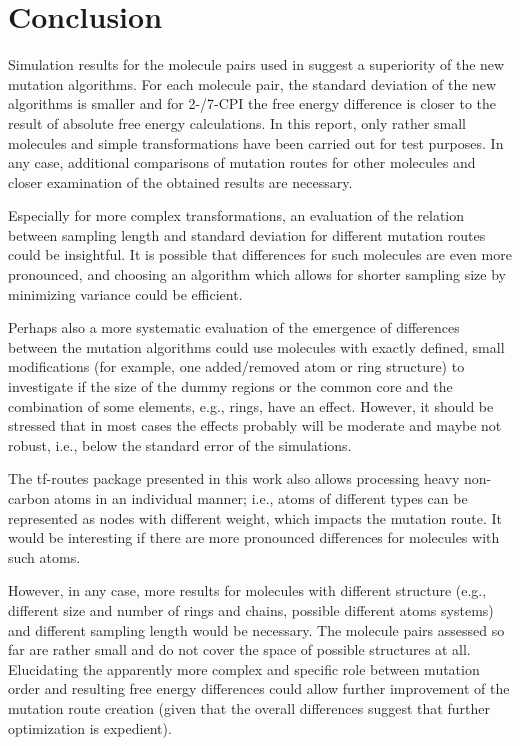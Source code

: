 \chapter{Conclusion}


Simulation results for the molecule pairs used in \cite{Loeffler.2018, Wieder.2022} suggest a superiority of the new mutation algorithms. For each molecule pair, the standard deviation of the new algorithms is smaller and for 2-/7-CPI the free energy difference is closer to the result of absolute free energy calculations. 
In this report, only rather small molecules and simple transformations have been carried out for test purposes. In any case, additional comparisons of mutation routes for other molecules and closer examination of the obtained results are necessary.

Especially for more complex transformations, an evaluation of the relation between sampling length and standard deviation for different mutation routes could be insightful. 
It is possible that differences for such molecules are even more pronounced, and choosing an algorithm which allows for shorter sampling size by minimizing variance could be efficient.

Perhaps also a more systematic evaluation of the emergence of differences between the mutation algorithms could use molecules with exactly defined, small modifications (for example, one added/removed atom or ring structure) to investigate if the size of the dummy regions or the common core and the combination of some elements, e.g., rings, have an effect. However, it should be stressed that in most cases the effects probably will be moderate and maybe not robust, i.e., below the standard error of the simulations.


The tf-routes package presented in this work also allows processing heavy non-carbon atoms in an individual manner; i.e., atoms of different types can be represented as nodes with different weight, which impacts the mutation route. It would be interesting if there are more pronounced differences for molecules with such atoms.

However, in any case, more results for molecules with different structure (e.g., different size and number of rings and chains, possible different atoms systems) and different sampling length would be necessary. The molecule pairs assessed so far are rather small and do not cover the space of possible structures at all.
Elucidating the apparently more complex and specific role between mutation order and resulting free energy differences could allow further improvement of the mutation route creation (given that the overall differences suggest that further optimization is expedient).

